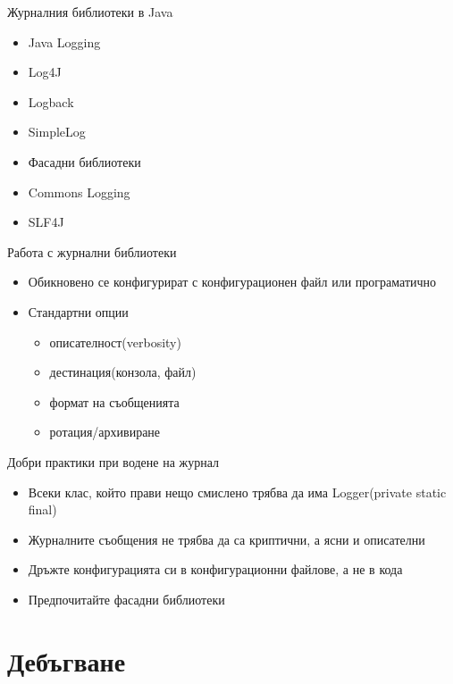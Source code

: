 \documentclass{beamer}
\begin{document}
\begin{frame}{Журналния библиотеки в Java}
  \transdissolve
  \begin{itemize}
  \item Java Logging \pause
  \item Log4J \pause
  \item Logback \pause
  \item SimpleLog \pause
  \item Фасадни библиотеки
    \item Commons Logging
    \item SLF4J
  \end{itemize}
\end{frame}

\begin{frame}{Работа с журнални библиотеки}
  \transdissolve
  \begin{itemize}
  \item Обикновено се конфигурират с конфигурационен файл или
    програматично \pause
  \item Стандартни опции
    \begin{itemize}
      \item описателност(verbosity)
      \item дестинация(конзола, файл)
      \item формат на съобщенията
      \item ротация/архивиране
    \end{itemize}
  \end{itemize}
\end{frame}

\begin{frame}{Добри практики при водене на журнал}
  \transdissolve
  \begin{itemize}
  \item Всеки клас, който прави нещо смислено трябва да има
    Logger(private static final) \pause
  \item Журналните съобщения не трябва да са криптични, а ясни и
    описателни \pause
  \item Дръжте конфигурацията си в конфигурационни файлове, а не в
    кода \pause
  \item Предпочитайте фасадни библиотеки
  \end{itemize}
\end{frame}


\section{Дебъгване}
\end{document}
